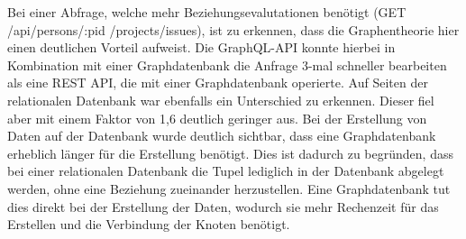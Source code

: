 \newline
\noindent
Bei einer Abfrage, welche mehr Beziehungsevalutationen benötigt  (GET /api/persons/:pid /projects/issues), ist zu erkennen, dass die Graphentheorie hier einen deutlichen Vorteil aufweist. Die GraphQL-API konnte hierbei in Kombination mit einer Graphdatenbank die Anfrage 3-mal schneller bearbeiten als eine REST API, die mit einer Graphdatenbank operierte. Auf Seiten der relationalen Datenbank war ebenfalls ein Unterschied zu erkennen. Dieser fiel aber mit einem Faktor von 1,6 deutlich geringer aus.
\newline
\noindent
Bei der Erstellung von Daten auf der Datenbank wurde deutlich sichtbar, dass eine Graphdatenbank erheblich länger für die Erstellung benötigt. Dies ist dadurch zu begründen, dass bei einer relationalen Datenbank die Tupel lediglich in der Datenbank abgelegt werden, ohne eine Beziehung zueinander herzustellen. Eine Graphdatenbank tut dies direkt bei der Erstellung der Daten, wodurch sie mehr Rechenzeit für das Erstellen und die Verbindung der Knoten benötigt. \citep{constantinov2015running}

